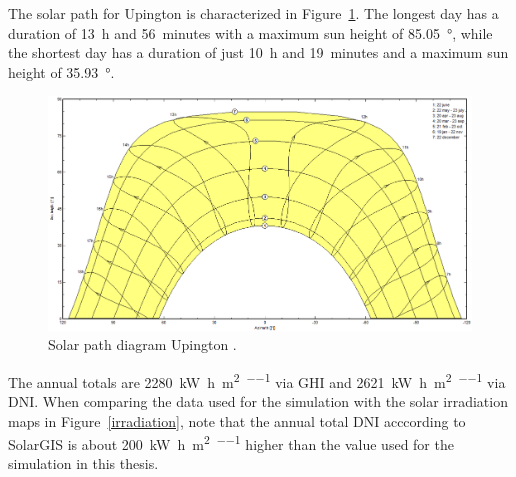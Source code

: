 The solar path for Upington is characterized in Figure~\ref{SunPathUpington}. The longest day has a duration of \SI{13}{h} and \SI{56}{minutes} with a maximum sun height of \SI{85.05}{\degree}, while the shortest day has a duration of just \SI{10}{h} and \SI{19}{minutes} and a maximum sun height of \SI{35.93}{\degree}.

\begin{figure}[htbp]  
\centering
\includegraphics[width=1\linewidth]{FIG/SunPathUpington}
\caption[Solar path diagram for Upington.]{Solar path diagram Upington \cite{PVsystSA2015}.}\label{SunPathUpington}
\end{figure}
\pagebreak

The annual totals are \SI{2280}{\kilo\watt\hour\per\square\metre\per\year} via GHI and \SI{2621}{\kilo\watt\hour\per\square\metre\per\year} via DNI. When comparing the data used for the simulation with the solar irradiation maps in Figure~\ref{irradiation}, note that the annual total DNI acccording to SolarGIS \cite{SolarGIS2015b} is about \SI{200}{\kilo\watt\hour\per\square\metre\per\year} higher than the value used for the simulation in this thesis.

